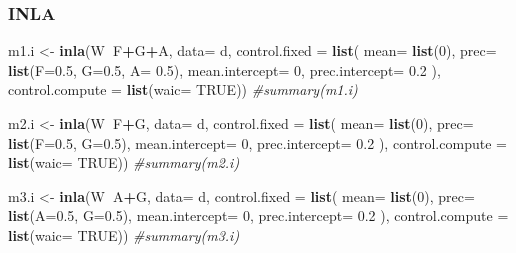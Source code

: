 \documentclass[
]{article}
\newenvironment{Shaded}{\begin{snugshade}}{\end{snugshade}}
\newcommand{\CommentTok}[1]{\textcolor[rgb]{0.56,0.35,0.01}{\textit{#1}}}
\newcommand{\DataTypeTok}[1]{\textcolor[rgb]{0.13,0.29,0.53}{#1}}
\newcommand{\DecValTok}[1]{\textcolor[rgb]{0.00,0.00,0.81}{#1}}
\newcommand{\FloatTok}[1]{\textcolor[rgb]{0.00,0.00,0.81}{#1}}
\newcommand{\KeywordTok}[1]{\textcolor[rgb]{0.13,0.29,0.53}{\textbf{#1}}}
\newcommand{\NormalTok}[1]{#1}
\newcommand{\OperatorTok}[1]{\textcolor[rgb]{0.81,0.36,0.00}{\textbf{#1}}}
\newcommand{\OtherTok}[1]{\textcolor[rgb]{0.56,0.35,0.01}{#1}}
\newcommand{\StringTok}[1]{\textcolor[rgb]{0.31,0.60,0.02}{#1}}
\begin{document}
\hypertarget{inla-2}{%
\subsubsection{INLA}\label{inla-2}}

\begin{Shaded}
\begin{Highlighting}[]
\NormalTok{m1.i <-}\StringTok{ }\KeywordTok{inla}\NormalTok{(W}\OperatorTok{~}\NormalTok{F}\OperatorTok{+}\NormalTok{G}\OperatorTok{+}\NormalTok{A, }\DataTypeTok{data=}\NormalTok{ d, }\DataTypeTok{control.fixed =} \KeywordTok{list}\NormalTok{(}
        \DataTypeTok{mean=} \KeywordTok{list}\NormalTok{(}\DecValTok{0}\NormalTok{), }
        \DataTypeTok{prec=} \KeywordTok{list}\NormalTok{(}\DataTypeTok{F=}\FloatTok{0.5}\NormalTok{, }\DataTypeTok{G=}\FloatTok{0.5}\NormalTok{, }\DataTypeTok{A=} \FloatTok{0.5}\NormalTok{), }
        \DataTypeTok{mean.intercept=} \DecValTok{0}\NormalTok{, }
        \DataTypeTok{prec.intercept=} \FloatTok{0.2}
\NormalTok{), }
\DataTypeTok{control.compute =} \KeywordTok{list}\NormalTok{(}\DataTypeTok{waic=} \OtherTok{TRUE}\NormalTok{))}
\CommentTok{#summary(m1.i)}

\NormalTok{m2.i <-}\StringTok{ }\KeywordTok{inla}\NormalTok{(W}\OperatorTok{~}\NormalTok{F}\OperatorTok{+}\NormalTok{G, }\DataTypeTok{data=}\NormalTok{ d, }\DataTypeTok{control.fixed =} \KeywordTok{list}\NormalTok{(}
        \DataTypeTok{mean=} \KeywordTok{list}\NormalTok{(}\DecValTok{0}\NormalTok{), }
        \DataTypeTok{prec=} \KeywordTok{list}\NormalTok{(}\DataTypeTok{F=}\FloatTok{0.5}\NormalTok{, }\DataTypeTok{G=}\FloatTok{0.5}\NormalTok{), }
        \DataTypeTok{mean.intercept=} \DecValTok{0}\NormalTok{, }
        \DataTypeTok{prec.intercept=} \FloatTok{0.2}
\NormalTok{), }
\DataTypeTok{control.compute =} \KeywordTok{list}\NormalTok{(}\DataTypeTok{waic=} \OtherTok{TRUE}\NormalTok{))}
\CommentTok{#summary(m2.i)}

\NormalTok{m3.i <-}\StringTok{ }\KeywordTok{inla}\NormalTok{(W}\OperatorTok{~}\NormalTok{A}\OperatorTok{+}\NormalTok{G, }\DataTypeTok{data=}\NormalTok{ d, }\DataTypeTok{control.fixed =} \KeywordTok{list}\NormalTok{(}
        \DataTypeTok{mean=} \KeywordTok{list}\NormalTok{(}\DecValTok{0}\NormalTok{), }
        \DataTypeTok{prec=} \KeywordTok{list}\NormalTok{(}\DataTypeTok{A=}\FloatTok{0.5}\NormalTok{, }\DataTypeTok{G=}\FloatTok{0.5}\NormalTok{), }
        \DataTypeTok{mean.intercept=} \DecValTok{0}\NormalTok{, }
        \DataTypeTok{prec.intercept=} \FloatTok{0.2}
\NormalTok{), }
\DataTypeTok{control.compute =} \KeywordTok{list}\NormalTok{(}\DataTypeTok{waic=} \OtherTok{TRUE}\NormalTok{))}
\CommentTok{#summary(m3.i)}


\end{Highlighting}
\end{Shaded}
\end{document}
